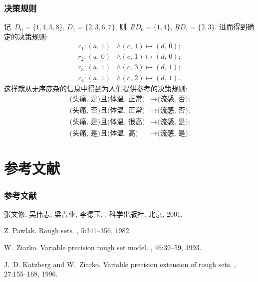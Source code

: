 \documentclass[notheorems,mathserif,table]{beamer}
\begin{document}
\begin{frame}\frametitle{决策规则}
记~$D_0=\{1,4,5,8\},\,D_1=\{2,3,6,7\}$, 则~$\underline R {D_0}=\{1,4\}$,
$\underline R {D_1}=\{2,3\}$.
进而得到确定的决策规则:
\begin{align}
  r_1:   (a,\,1)&\wedge(c,\,1)\longmapsto (d,\,0);\\
  r_2:   (a,\,0)&\wedge(c,\,1)\longmapsto (d,\,0);\\
  r_3:   (a,\,1)&\wedge(c,\,3)\longmapsto (d,\,1);\\
  r_4:   (a,\,1)&\wedge(c,\,2)\longmapsto (d,\,1).
\end{align}
\pause
这样就从无序庞杂的信息中得到为人们提供参考的决策规则:
\begin{align}
     \text{(头痛, 是)且(体温, 正常)}& \longmapsto \text{(流感, 否);}\\
     \text{(头痛, 否)且(体温, 正常)}& \longmapsto \text{(流感, 否);}\\
     \text{(头痛, 是)且(体温, 很高)}& \longmapsto \text{(流感, 是);}\\
     \text{(头痛, 是)且(体温, 高)} & \longmapsto \text{(流感, 是).}
\end{align}
\end{frame}



\section{参考文献}
\begin{frame}\frametitle{参考文献}
\footnotesize
\begin{thebibliography}{10}
{\beamertemplatebookbibitems

张文修, 吴伟志, 梁吉业, 李德玉.
.
\newblock 科学出版社, 北京, 2001.}

Z. Pawlak.
\newblock Rough sets.
,
  5:341--356, 1982.

W.~Ziarko.
\newblock Variable precision rough set model.
, 46:39--59, 1993.

J.~D. Katzberg and W.~Ziarko.
\newblock Variable precision extension of rough sets.
, 27:155--168, 1996.

\end{thebibliography}
\end{frame}
\end{document}
